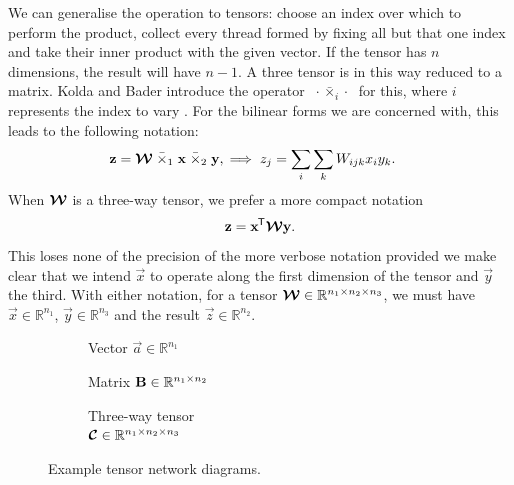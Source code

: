 We can generalise the operation to tensors: choose an index over which to perform the product,
collect every thread formed by fixing all but that one index and take their inner product with the
given vector. If the tensor has \(n\) dimensions, the result will have \(n-1\). A three tensor is in
this way reduced to a matrix. Kolda and Bader introduce the operator
 \(\;\cdot \bar{\times}_i \cdot\;\)
for this, where \(i\) represents the index to vary \autocite{Kolda2009}. For the bilinear forms
we are concerned with, this leads to the following notation:
\begin{align}
	\mathbf{z} &= \bm{\mathcal{W}} \;\bar{\times}_1\; \mathbf{x}\; \bar{\times}_2\; \mathbf{y},
	\implies z_j = \sum_i \sum_k W_{ijk}x_iy_k.
	\label{eq:bilinearkolda}
\end{align}
When \(\bm{\mathcal{W}}\) is a three-way tensor, we prefer a more compact notation
\begin{equation}\label{eq:bilintensor}
	\mathbf{z} = \mathbf{x}^{\mkern-1.5mu\mathsf{T}}\bm{\mathcal{W}}\mathbf{y}.
\end{equation} This loses none of the precision of the more verbose notation provided we make clear
that we intend \(\vec{x}\) to operate along the first dimension of the tensor and \(\vec{y}\) the
third. With either notation, for a tensor 
\(\bm{\mathcal{W}} \in \mathbb{R}^{n_1 \times n_2 \times n_3}\), we must have 
\(\vec{x}\in \mathbb{R}^{n_1}\), \(\vec{y} \in \mathbb{R}^{n_3}\) and the result 
\(\vec{z}\in\mathbb{R}^{n_2}\).

\begin{figure}
	\centering
	\begin{subfigure}[t]{0.31\textwidth}
	\centering
	\caption{Vector \(\vec{a}\in\mathbb{R}^{n_1}\)}\label{fig:tnd:vec}
	\end{subfigure} \hfill
	\begin{subfigure}[t]{0.31\textwidth}
	\centering
	\caption{Matrix \(\mathbf{B}\in\mathbb{R}^{n_1 \times n_2}\)}\label{fig:tnd:mat}
	\end{subfigure}\hfill
	\begin{subfigure}[t]{0.31\textwidth}
	\centering
	\caption{Three-way tensor\\ 
		\(\bm{\mathcal{C}}\in\mathbb{R}^{n_1\times n_2\times n_3}\)}\label{fig:tnd:3ten}
	\end{subfigure}
	\caption{Example tensor network diagrams.}
	\label{fig:tnegs}
\end{figure}

